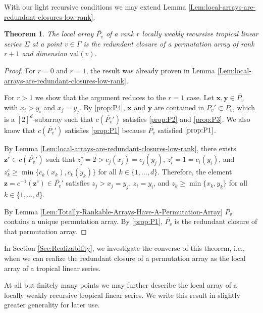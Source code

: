 \documentclass{amsart}
\newtheorem{theorem}{Theorem}[section]
\begin{document}
	With our light recursive conditions we may extend Lemma \ref{Lem:local-arrays-are-redundant-closures-low-rank}.
	
	\begin{theorem}
		\label{Thm:local-arrays-are-redundant-closures}
		The local array $\overline{P_v}$ of a rank $r$ locally weakly recursive tropical linear series $\Sigma$ at a point $v \in \Gamma$ is the redundant closure of a permutation array of rank $r+1$ and dimension $\mathrm{val}(v)$.
	\end{theorem}
	
	\begin{proof}
		For $r = 0$ and $r = 1$, the result was already proven in Lemma \ref{Lem:local-arrays-are-redundant-closures-low-rank}.
		
		For $r > 1$ we show that the argument reduces to the $r = 1$ case. Let $\mathbf{x}, \mathbf{y} \in \overline{P_v}$ with $x_i > y_i$ and $x_j = y_j$. By \ref{prop:P4}, $\mathbf{x}$ and $\mathbf{y}$ are contained in $\overline{P_v}' \subset \overline{P_v}$, which is a $[2]^d$-subarray such that $c(\overline{P_v}')$ satisfies \ref{prop:P2} and \ref{prop:P3}. We also know that $c(\overline{P_v}')$ satisfies \ref{prop:P1} because $\overline{P_v}$ satisfied $\ref{prop:P1}$.
		
		By Lemma \ref{Lem:local-arrays-are-redundant-closures-low-rank}, there exists $\mathbf{z}^c \in c(\overline{P_v}')$ such that $z_j^c = 2 > c_j(x_j) = c_j(y_j)$, $z_i^c = 1 = c_i(y_i)$, and $z_k^c \geq \min \{ c_k(x_k), c_k(y_k) \}$ for all $k \in \{ 1, \ldots , d \}$. Therefore, the element $\mathbf{z} = c^{-1}(\mathbf{z}^c) \in \overline{P_v}'$ satisfies $z_j > x_j = y_j$, $z_i = y_i$, and $z_k \geq \min \{ x_k, y_k \}$ for all $k \in \{ 1, \ldots , d \}$.
		
		By Lemma \ref{Lem:Totally-Rankable-Arrays-Have-A-Permutation-Array} $\overline{P_v}$ contains a unique permutation array. By \ref{prop:P1}, $\overline{P_v}$ is the redundant closure of that permutation array.
	\end{proof}
	
	In Section \ref{Sec:Realizability}, we investigate the converse of this theorem, i.e., when we can realize the redundant closure of a permutation array as the local array of a tropical linear series.
	
	At all but finitely many points we may further describe the local array of a locally weakly recursive tropical linear series. We write this result in slightly greater generality for later use.
	
\end{document}

